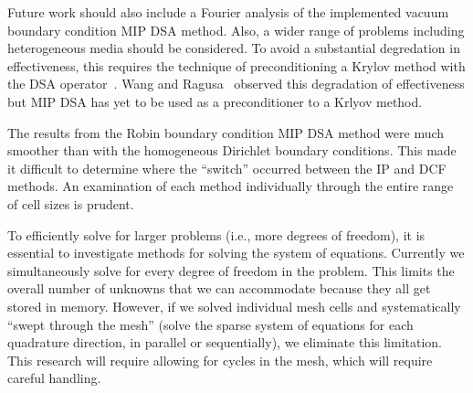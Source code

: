 \documentclass[12pt]{article}
\begin{document}
Future work should also include a Fourier analysis of the implemented vacuum boundary condition MIP DSA method. Also, a wider range of problems including heterogeneous media should be considered. To avoid a substantial degredation in effectiveness, this requires the technique of preconditioning a Krylov method with the DSA operator~\cite{WarsaKrylovDSA}. Wang and Ragusa~\cite{WangRagusaDSA} observed this degradation of effectiveness but MIP DSA has yet to be used as a preconditioner to a Krlyov method.

The results from the Robin boundary condition MIP DSA method were much smoother than with the homogeneous Dirichlet boundary conditions. This made it difficult to determine where the ``switch'' occurred between the IP and DCF methods. An examination of each method individually through the entire range of cell sizes is prudent.

To efficiently solve for larger problems (i.e., more degrees of freedom), it is essential to investigate methods for solving the system of equations. Currently we simultaneously solve for every degree of freedom in the problem. This limits the overall number of unknowns that we can accommodate because they all get stored in memory. However, if we solved individual mesh cells and systematically ``swept through the mesh'' (solve the sparse system of equations for each quadrature direction, in parallel or sequentially), we eliminate this limitation. This research will require allowing for cycles in the mesh, which will require careful handling.

%
%
\end{document}
